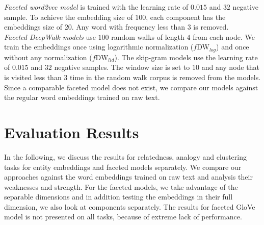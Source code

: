 \noindent
\emph{Faceted word2vec model} is trained with the learning rate of $0.015$ and $32$ negative sample. To achieve the embedding size of $100$, each component has the embeddings size of $20$. Any word with frequency less than $3$ is removed. \\

\noindent
\emph{Faceted DeepWalk models} use $100$ random walks of length $4$ from each node. We train the embeddings once using logarithmic normalization ($f$DW$_{log}$) and once without any normalization ($f$DW$_{lid}$). The skip-gram models use the learning rate of $0.015$ and $32$ negative samples. The window size is set to $10$ and any node that is visited less than $3$ time in the random walk corpus is removed from the models. 
\\

Since a comparable faceted model does not exist, we compare our models against the regular word embeddings trained on raw text. 
\section{Evaluation Results}\label{sec:eval_results}
In the following, we discuss the results for relatedness, analogy and clustering tasks for entity embeddings and faceted models separately. We compare our approaches against the word embeddings trained on raw text and analysis their weaknesses and strength. For the faceted models, we take advantage of the separable dimensions and in addition testing the embeddings in their full dimension, we also look at components separately. The results for faceted GloVe model is not presented on all tasks, because of extreme lack of performance. 
